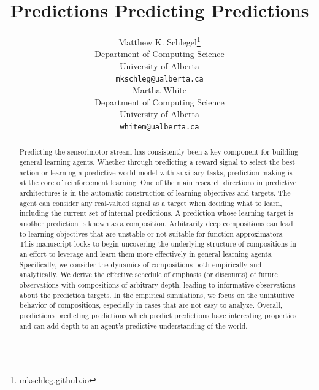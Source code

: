 \documentclass[11pt]{article} %
\title{Predictions Predicting Predictions} %
\author{
  Matthew K. Schlegel\thanks{mkschleg.github.io} \\
  Department of Computing Science \\
  University of Alberta\\
  \texttt{mkschleg@ualberta.ca} \\
  \And
  Martha White \\
  Department of Computing Science \\
  University of Alberta \\
  \texttt{whitem@ualberta.ca}
}
\begin{document}
\maketitle

\begin{abstract}
  Predicting the sensorimotor stream has consistently been a key component for building general learning agents. Whether through predicting a reward signal to select the best action or learning a predictive world model with auxiliary tasks, prediction making is at the core of reinforcement learning. One of the main research directions in predictive architectures is in the automatic construction of learning objectives and targets. The agent can consider any real-valued signal as a target when deciding what to learn, including the current set of internal predictions. A prediction whose learning target is another prediction is known as a composition. Arbitrarily deep compositions can lead to learning objectives that are unstable or not suitable for function approximators. This manuscript looks to begin uncovering the underlying structure of compositions in an effort to leverage and learn them more effectively in general learning agents. Specifically, we consider the dynamics of compositions both empirically and analytically. We derive the effective schedule of emphasis (or discounts) of future observations with compositions of arbitrary depth, leading to informative observations about the prediction targets. In the empirical simulations, we focus on the unintuitive behavior of compositions, especially in cases that are not easy to analyze. Overall, predictions predicting predictions which predict predictions have interesting properties and can add depth to an agent's predictive understanding of the world.
  


\end{abstract}
\end{document}
